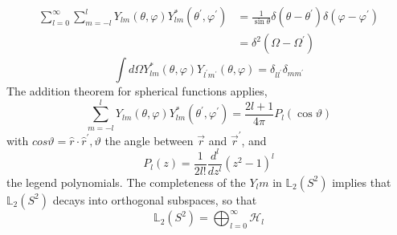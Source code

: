 \begin{equation}
\begin{aligned} \sum_{l=0}^{\infty} \sum_{m=-l}^{l} Y_{l m}(\theta, \varphi) Y_{l m}^{*}\left(\theta^{\prime}, \varphi^{\prime}\right) &=\frac{1}{\sin \theta} \delta\left(\theta-\theta^{\prime}\right) \delta\left(\varphi-\varphi^{\prime}\right) \\ 
&=\delta^{2}\left(\Omega-\Omega^{\prime}\right) 
\end{aligned}
\end{equation}
\begin{equation}
    \int d \Omega Y_{l m}^{*}(\theta, \varphi) Y_{l^{\prime} m^{\prime}}(\theta, \varphi) =\delta_{l l^{\prime}} \delta_{m m^{\prime}} 
\end{equation}
The addition theorem for spherical functions applies,
\begin{equation}
    \sum_{m=-l}^{l} Y_{l m}(\theta, \varphi) Y_{l m}^{*}\left(\theta^{\prime}, \varphi^{\prime}\right)=\frac{2 l+1}{4 \pi} P_{l}(\cos \vartheta)
    \end{equation}
with $cos\vartheta = \hat{r} \cdot \hat{r}^{\prime}, \vartheta$ the angle between $\vec{r}$ and $\vec{r}^{\prime}$, and
\begin{equation}
    P_{l}(z)=\frac{1}{2 l !} \frac{d^{l}}{d z^{l}}\left(z^{2}-1\right)^{l}
    \end{equation}
the legend polynomials. The completeness of the $Y_lm$ in $\mathbb{L}_2(S^2)$ implies that $\mathbb{L}_2(S^2)$ decays into orthogonal subspaces, so that
\begin{equation}
    \mathbb{L}_{2}\left(S^{2}\right)=\bigoplus_{l=0}^{\infty} \mathcal{H}_{l}
    \end{equation}
